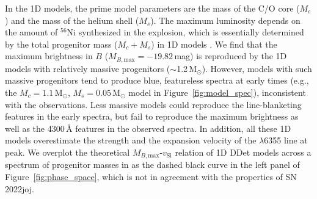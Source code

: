 \documentclass[twocolumn]{aastex631}
\newcommand{\sn}{SN\,2022joj}
\begin{document}
\begin{CJK*}{UTF8}{gbsn}
In the 1D models, the prime model parameters are the mass of the C/O core ($M_c$) and the mass of the helium shell ($M_s$). The maximum luminosity depends on the amount of $^{56}$Ni synthesized in the explosion, which is essentially determined by the total progenitor mass ($M_c+M_s$) in 1D models \citep{polin_observational_2019}. We find that the maximum brightness in $B$ ($M_{B,\mathrm{max}}=-19.82$\,mag) is reproduced by the 1D models with relatively massive progenitors ($\sim$1.2\,$\mathrm{M_\odot}$). However, models with such massive progenitors tend to produce blue, featureless spectra at early times (e.g., the $M_c=1.1\,\mathrm{M_\odot}$, $M_s=0.05\,\mathrm{M_\odot}$ model in Figure~\ref{fig:model_spec}), inconsistent with the observations. Less massive models could reproduce the line-blanketing features in the early spectra, but fail to reproduce the maximum brightness as well as the 4300\,\r{A} features in the observed spectra. In addition, all these 1D models overestimate the strength and the expansion velocity of the  $\lambda$6355 line at peak. We overplot the theoretical $M_{B,\mathrm{max}}$-$v_\mathrm{Si}$ relation of 1D DDet models across a spectrum of progenitor masses in \citet{polin_observational_2019} as the dashed black curve in the left panel of Figure~\ref{fig:phase_space}, which is not in agreement with the properties of \sn.


\end{CJK*}
\end{document}
